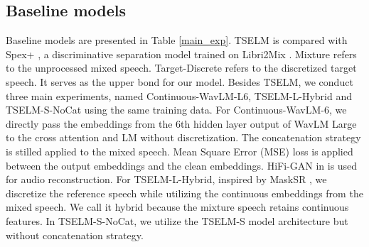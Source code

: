 \documentclass[conference]{IEEEtran}
\begin{document}
\subsection{Baseline models}
Baseline models are presented in Table \ref{main_exp}. 
TSELM is compared with Spex+ \cite{spex_plus}, a discriminative separation model trained on Libri2Mix \cite{librimix}. 
Mixture refers to the unprocessed mixed speech. 
Target-Discrete refers to the discretized target speech. It serves as the upper bond for our model.  Besides TSELM, we conduct three main experiments, named
 Continuous-WavLM-L6, TSELM-L-Hybrid and TSELM-S-NoCat using the same training data. 
For Continuous-WavLM-6, we directly
pass the embeddings from the 6th hidden layer output of WavLM Large to the cross attention  
and LM without discretization. 
The concatenation strategy is stilled applied to the mixed speech. Mean Square Error (MSE) loss is applied between the output embeddings and the clean 
embeddings. HiFi-GAN in \cite{knn_vc} is used for audio reconstruction. For 
TSELM-L-Hybrid, inspired by MaskSR \cite{mask_sr}, we discretize the reference 
speech while utilizing the continuous embeddings from the mixed speech. We call 
it hybrid because the mixture speech retains continuous features. In TSELM-S-NoCat, we utilize the TSELM-S model architecture but without concatenation strategy. 
\end{document}
